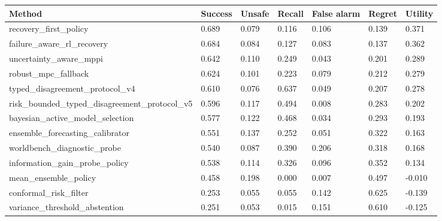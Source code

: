\begin{tabular}{lllllll}
\toprule
Method & Success & Unsafe & Recall & False alarm & Regret & Utility \\
\midrule
recovery\_first\_policy & 0.689 & 0.079 & 0.116 & 0.106 & 0.139 & 0.371 \\
failure\_aware\_rl\_recovery & 0.684 & 0.084 & 0.127 & 0.083 & 0.137 & 0.362 \\
uncertainty\_aware\_mppi & 0.642 & 0.110 & 0.249 & 0.043 & 0.201 & 0.289 \\
robust\_mpc\_fallback & 0.624 & 0.101 & 0.223 & 0.079 & 0.212 & 0.279 \\
typed\_disagreement\_protocol\_v4 & 0.610 & 0.076 & 0.637 & 0.049 & 0.207 & 0.278 \\
risk\_bounded\_typed\_disagreement\_protocol\_v5 & 0.596 & 0.117 & 0.494 & 0.008 & 0.283 & 0.202 \\
bayesian\_active\_model\_selection & 0.577 & 0.122 & 0.468 & 0.034 & 0.293 & 0.193 \\
ensemble\_forecasting\_calibrator & 0.551 & 0.137 & 0.252 & 0.051 & 0.322 & 0.163 \\
worldbench\_diagnostic\_probe & 0.540 & 0.087 & 0.390 & 0.206 & 0.318 & 0.168 \\
information\_gain\_probe\_policy & 0.538 & 0.114 & 0.326 & 0.096 & 0.352 & 0.134 \\
mean\_ensemble\_policy & 0.458 & 0.198 & 0.000 & 0.007 & 0.497 & -0.010 \\
conformal\_risk\_filter & 0.253 & 0.055 & 0.055 & 0.142 & 0.625 & -0.139 \\
variance\_threshold\_abstention & 0.251 & 0.053 & 0.015 & 0.151 & 0.610 & -0.125 \\
\bottomrule
\end{tabular}
